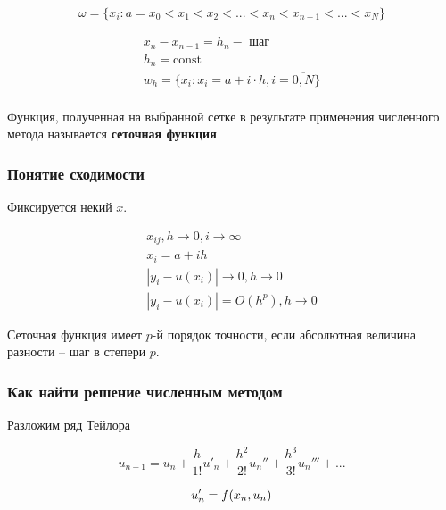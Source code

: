\begin{equation*}
    \omega = \{
        x_i : a = x_0 < x_1 < x_2 < ... < x_n < x_{n+1} < ... < x_N
    \}
\end{equation*}

\begin{equation*}
    \begin{matrix}
        x_n - x_{n-1} = h_n - \text{ шаг} \\
        h_n = \text{const} \\
        w_h = \{ x_i : x_i = a + i \cdot h, i = \overline{0,N} \} \\
    \end{matrix}
\end{equation*}

Функция, полученная на выбранной сетке в результате применения
численного метода называется \textbf{сеточная функция}

\subsubsection{Понятие сходимости}

Фиксируется некий $x$.

\begin{equation*}
    \begin{matrix}
        x_{ij}, h \to 0, i \to \infty \\
        x_i = a + ih \\
        |y_i - u(x_i)| \to 0, h \to 0 \\
        |y_i - u(x_i)| = O(h^p), h \to 0
    \end{matrix}
\end{equation*}

Сеточная функция имеет $p$-й порядок точности, если абсолютная
величина разности -- шаг в степери $p$.

\subsubsection{Как найти решение численным методом}

Разложим ряд Тейлора

\begin{equation*}
    u_{n+1} = u_n + \frac{h}{1!} u'_n + \frac{h^2}{2!} u_n'' +
    \frac{h^3}{3!} u_n''' + ...
\end{equation*}

\begin{equation*}
    u'_n = f(x_n, u_n) \\
\end{equation*}


